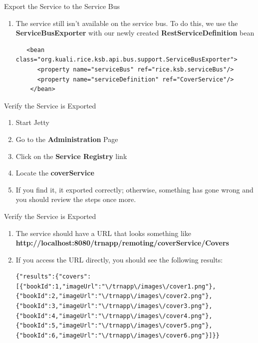 \documentclass[xcolor=dvipsnames,14pt,professionalfonts]{beamer}
\begin{document}
 \begin{frame}[fragile]{Export the Service to the Service Bus}
  \begin{enumerate}
    \item The service still isn't available on the service bus. To do
      this, we use the \textbf{ServiceBusExporter} with our newly
      created \textbf{RestServiceDefinition} bean
    \begin{verbatim}
   <bean class="org.kuali.rice.ksb.api.bus.support.ServiceBusExporter">
      <property name="serviceBus" ref="rice.ksb.serviceBus"/>
      <property name="serviceDefinition" ref="CoverService"/>
    </bean>
    \end{verbatim}
    \end{enumerate}
\end{frame}

 \begin{frame}[fragile]{Verify the Service is Exported}
  \begin{enumerate}
    \item Start Jetty
    \item Go to the \textbf{Administration} Page
    \item Click on the \textbf{Service Registry} link
    \item Locate the \textbf{coverService}
      \item If you find it, it exported correctly; otherwise,
        something has gone wrong and you should review the steps once more.
    \end{enumerate}
\end{frame}

 \begin{frame}[fragile]{Verify the Service is Exported}
  \begin{enumerate}
  \item The service should have a URL that looks something like
    \textbf{http://localhost:8080/trnapp/remoting/coverService/Covers}
  \item If you access the URL directly, you should see the following
    results:
        \begin{verbatim}
{"results":{"covers":[{"bookId":1,"imageUrl":"\/trnapp\/images\/cover1.png"},{"bookId":2,"imageUrl":"\/trnapp\/images\/cover2.png"},{"bookId":3,"imageUrl":"\/trnapp\/images\/cover3.png"},{"bookId":4,"imageUrl":"\/trnapp\/images\/cover4.png"},{"bookId":5,"imageUrl":"\/trnapp\/images\/cover5.png"},{"bookId":6,"imageUrl":"\/trnapp\/images\/cover6.png"}]}}
          \end{verbatim}
    \end{enumerate}
\end{frame}
\end{document}
